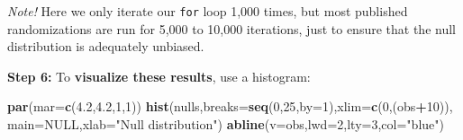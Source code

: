 \documentclass[]{book}
\newenvironment{Shaded}{\begin{snugshade}}{\end{snugshade}}
\newcommand{\CommentTok}[1]{\textcolor[rgb]{0.56,0.35,0.01}{\textit{#1}}}
\newcommand{\ControlFlowTok}[1]{\textcolor[rgb]{0.13,0.29,0.53}{\textbf{#1}}}
\newcommand{\DataTypeTok}[1]{\textcolor[rgb]{0.13,0.29,0.53}{#1}}
\newcommand{\DecValTok}[1]{\textcolor[rgb]{0.00,0.00,0.81}{#1}}
\newcommand{\FloatTok}[1]{\textcolor[rgb]{0.00,0.00,0.81}{#1}}
\newcommand{\KeywordTok}[1]{\textcolor[rgb]{0.13,0.29,0.53}{\textbf{#1}}}
\newcommand{\NormalTok}[1]{#1}
\newcommand{\OperatorTok}[1]{\textcolor[rgb]{0.81,0.36,0.00}{\textbf{#1}}}
\newcommand{\OtherTok}[1]{\textcolor[rgb]{0.56,0.35,0.01}{#1}}
\newcommand{\StringTok}[1]{\textcolor[rgb]{0.31,0.60,0.02}{#1}}
\begin{document}
\begin{Shaded}
\end{Shaded}

\emph{Note!} Here we only iterate our \texttt{for} loop 1,000 times, but most published randomizations are run for 5,000 to 10,000 iterations, just to ensure that the null distribution is adequately unbiased.

\textbf{Step 6:} To \textbf{visualize these results}, use a histogram:

\begin{Shaded}
\begin{Highlighting}[]
\KeywordTok{par}\NormalTok{(}\DataTypeTok{mar=}\KeywordTok{c}\NormalTok{(}\FloatTok{4.2}\NormalTok{,}\FloatTok{4.2}\NormalTok{,}\DecValTok{1}\NormalTok{,}\DecValTok{1}\NormalTok{))}
\KeywordTok{hist}\NormalTok{(nulls,}\DataTypeTok{breaks=}\KeywordTok{seq}\NormalTok{(}\DecValTok{0}\NormalTok{,}\DecValTok{25}\NormalTok{,}\DataTypeTok{by=}\DecValTok{1}\NormalTok{),}\DataTypeTok{xlim=}\KeywordTok{c}\NormalTok{(}\DecValTok{0}\NormalTok{,(obs}\OperatorTok{+}\DecValTok{10}\NormalTok{)),}
     \DataTypeTok{main=}\OtherTok{NULL}\NormalTok{,}\DataTypeTok{xlab=}\StringTok{"Null distribution"}\NormalTok{)}
\KeywordTok{abline}\NormalTok{(}\DataTypeTok{v=}\NormalTok{obs,}\DataTypeTok{lwd=}\DecValTok{2}\NormalTok{,}\DataTypeTok{lty=}\DecValTok{3}\NormalTok{,}\DataTypeTok{col=}\StringTok{"blue"}\NormalTok{)}
\end{Highlighting}
\end{Shaded}
\end{document}
